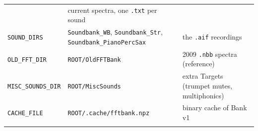\documentclass[
  10pt,
]{article}
\begin{document}
\begin{longtable}[]{@{}lll@{}}
\begin{minipage}[t]{0.30\columnwidth}
\end{minipage} &
\begin{minipage}[t]{0.30\columnwidth}\raggedright
current spectra, one \texttt{.txt} per sound\strut
\end{minipage}\tabularnewline
\begin{minipage}[t]{0.30\columnwidth}\raggedright
\texttt{SOUND\_DIRS}\strut
\end{minipage} &
\begin{minipage}[t]{0.30\columnwidth}\raggedright
\texttt{Soundbank\_WB}, \texttt{Soundbank\_Str},
\texttt{Soundbank\_PianoPercSax}\strut
\end{minipage} &
\begin{minipage}[t]{0.30\columnwidth}\raggedright
the \texttt{.aif} recordings\strut
\end{minipage}\tabularnewline
\begin{minipage}[t]{0.30\columnwidth}\raggedright
\texttt{OLD\_FFT\_DIR}\strut
\end{minipage} &
\begin{minipage}[t]{0.30\columnwidth}\raggedright
\texttt{ROOT/OldFFTBank}\strut
\end{minipage} &
\begin{minipage}[t]{0.30\columnwidth}\raggedright
2009 \texttt{.nbb} spectra (reference)\strut
\end{minipage}\tabularnewline
\begin{minipage}[t]{0.30\columnwidth}\raggedright
\texttt{MISC\_SOUNDS\_DIR}\strut
\end{minipage} &
\begin{minipage}[t]{0.30\columnwidth}\raggedright
\texttt{ROOT/MiscSounds}\strut
\end{minipage} &
\begin{minipage}[t]{0.30\columnwidth}\raggedright
extra Targets (trumpet mutes, multiphonics)\strut
\end{minipage}\tabularnewline
\begin{minipage}[t]{0.30\columnwidth}\raggedright
\texttt{CACHE\_FILE}\strut
\end{minipage} &
\begin{minipage}[t]{0.30\columnwidth}\raggedright
\texttt{ROOT/.cache/fftbank.npz}\strut
\end{minipage} &
\begin{minipage}[t]{0.30\columnwidth}\raggedright
binary cache of Bank v1\strut
\end{minipage}\tabularnewline
\begin{minipage}[t]{0.30\columnwidth}\raggedright

\end{minipage}
\end{longtable}
\end{document}

